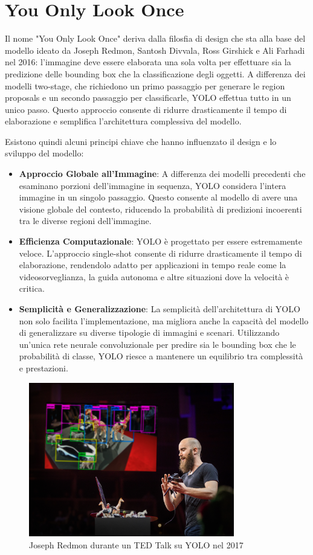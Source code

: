 \section{You Only Look Once}

Il nome "You Only Look Once" deriva dalla filosfia di design che sta alla base del modello ideato da Joseph Redmon, Santosh Divvala, Ross Girshick e Ali Farhadi nel 2016\cite{14}: l'immagine deve essere elaborata una sola volta per effettuare sia la predizione delle bounding box che la classificazione degli oggetti. A differenza dei modelli two-stage, che richiedono un primo passaggio per generare le region proposals e un secondo passaggio per classificarle, YOLO effettua tutto in un unico passo. Questo approccio consente di ridurre drasticamente il tempo di elaborazione e semplifica l'architettura complessiva del modello.

Esistono quindi alcuni principi chiave che hanno influenzato il design e lo sviluppo del modello:
\begin{itemize}
  \item \textbf{Approccio Globale all'Immagine}: A differenza dei modelli precedenti che esaminano porzioni dell'immagine in sequenza, YOLO considera l'intera immagine in un singolo passaggio. Questo consente al modello di avere una visione globale del contesto, riducendo la probabilità di predizioni incoerenti tra le diverse regioni dell'immagine.
  \item \textbf{Efficienza Computazionale}: YOLO è progettato per essere estremamente veloce. L'approccio single-shot consente di ridurre drasticamente il tempo di elaborazione, rendendolo adatto per applicazioni in tempo reale come la videosorveglianza, la guida autonoma e altre situazioni dove la velocità è critica.
  \item \textbf{Semplicità e Generalizzazione}:  La semplicità dell'architettura di YOLO non solo facilita l'implementazione, ma migliora anche la capacità del modello di generalizzare su diverse tipologie di immagini e scenari. Utilizzando un'unica rete neurale convoluzionale per predire sia le bounding box che le probabilità di classe, YOLO riesce a mantenere un equilibrio tra complessità e prestazioni.
\end{itemize}

\begin{figure}[ht]
    \centering
    \includegraphics[width=0.8\textwidth]{files/capitoli/2-yolo/assets/joseph-redmon.jpeg}
    \caption{\label{fig:joseph-redmon}Joseph Redmon durante un TED Talk su YOLO nel 2017\cite{16}}
\end{figure}